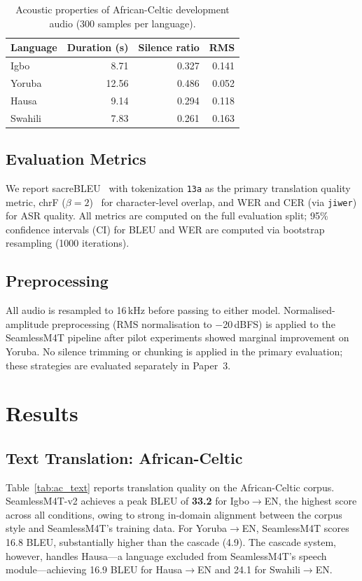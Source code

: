 \documentclass[11pt,a4paper]{article}
\newcommand{\dataAC}{African-Celtic}
\begin{document}
\begin{table}[t]
\centering
\small
\caption{Acoustic properties of \dataAC{} development audio (300 samples per language).}
\label{tab:eda}
\begin{tabular}{lrrr}
\toprule
\textbf{Language} & \textbf{Duration (s)} & \textbf{Silence ratio} & \textbf{RMS} \\
\midrule
Igbo    & 8.71 & 0.327 & 0.141 \\
Yoruba  & 12.56 & 0.486 & 0.052 \\
Hausa   & 9.14 & 0.294 & 0.118 \\
Swahili & 7.83 & 0.261 & 0.163 \\
\bottomrule
\end{tabular}
\end{table}

\subsection{Evaluation Metrics}

We report sacreBLEU~\citep{post2018call} with tokenization \texttt{13a} as the primary translation quality metric, chrF ($\beta\!=\!2$)~\citep{popovic2015chrf} for character-level overlap, and WER and CER (via \texttt{jiwer}) for ASR quality. All metrics are computed on the full evaluation split; 95\% confidence intervals (CI) for BLEU and WER are computed via bootstrap resampling (1000 iterations).

\subsection{Preprocessing}
All audio is resampled to 16\,kHz before passing to either model. Normalised-amplitude preprocessing (RMS normalisation to $-$20\,dBFS) is applied to the SeamlessM4T pipeline after pilot experiments showed marginal improvement on Yoruba. No silence trimming or chunking is applied in the primary evaluation; these strategies are evaluated separately in Paper~3.

\section{Results}
\label{sec:results}

\subsection{Text Translation: \dataAC{}}

Table~\ref{tab:ac_text} reports translation quality on the \dataAC{} corpus. SeamlessM4T-v2 achieves a peak BLEU of \textbf{33.2} for Igbo$\to$EN, the highest score across all conditions, owing to strong in-domain alignment between the corpus style and SeamlessM4T's training data. For Yoruba$\to$EN, SeamlessM4T scores 16.8 BLEU, substantially higher than the cascade (4.9). The cascade system, however, handles Hausa—a language excluded from SeamlessM4T's speech module—achieving 16.9 BLEU for Hausa$\to$EN and 24.1 for Swahili$\to$EN.
\end{document}

